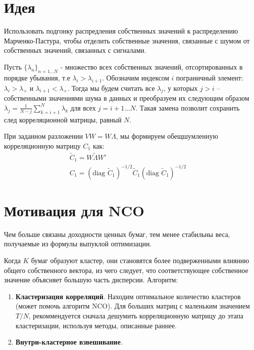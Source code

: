 \documentclass[11pt,a4paper]{article}
\begin{document}
\section*{Идея}
Использовать подгонку распредления собственных значений к распределению
Марченко-Пастура, чтобы отделить собственные значения, связанные с шумом
от собственных значений, связанных с сигналами.

Пусть $ \{\lambda_n\}_{n=1\dots N} $ - множество всех собственных значений,
отсортированных в порядке убывания, т.е $ \lambda_i > \lambda_{i+1} $. Обозначим
индексом $ i $ пограничный элемент: $ \lambda_i  > \lambda_+$ и
$ \lambda_{i+1} < \lambda_+ $. Тогда мы будем считать все $ \lambda_j $, у которых
$ j > i $ -- собственными значениями шума в данных и преобразуем их
следующим образом $ \lambda_j = \frac{1}{N-j}\sum_{k=i+1}^{N} \lambda_k $ для
всех $ j = i+1\dots N $. Такая замена позволит сохранить след корреляционной
матрицы, равный $ N $.

При заданном разложении $ VW = W \Lambda $, мы формируем
обещшумленную корреляционную матрицу $ C_1 $ как:
\begin{gather*}
    \tilde{C}_1 = W \tilde{\Lambda}W' \\
    C_1 = (\text{diag } \tilde{C}_1)^{-1/2} \tilde{C}_1 (\text{diag } \tilde{C}_1)^{-1/2}
\end{gather*}

\section*{Мотивация для NCO}
Чем больше связаны доходности ценных бумаг, тем менее стабильны
веса, получаемые из формулы выпуклой оптимизации.

Когда $ K $ бумаг образуют кластер, они становятся более подверженными
влиянию общего собственного вектора, из чего следует, что соответствующее
собственное значение объясняет большую часть дисперсии.
Алгоритм:
\begin{enumerate}
    \item \textbf{Кластеризация корреляций}. Находим оптимальное количество
          кластеров (может помочь алгоритм NCO). Для больших матриц с маленьким
          значением $ T/N $, рекоммендуется сначала дешумить корреляционную матрицу
          до этапа кластеризации, используя методы, описанные раннее.
    \item \textbf{Внутри-кластерное взвешивание}.
\end{enumerate}
\end{document}
